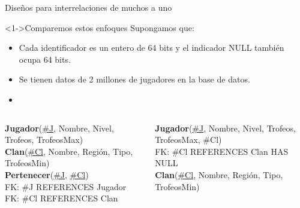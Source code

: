 \begin{frame}{Dise\~nos para interrelaciones de muchos a uno}
    \begin{small}
        
        \begin{block}<1->{Comparemos estos enfoques}
            Supongamos que: \begin{itemize}
                \item  Cada identificador es un entero de 64 bits y el indicador NULL tambi\'en ocupa 64 bits.
                \item  Se tienen datos de 2 millones de jugadores en la base de datos.
                \item  {}
            \end{itemize}
        \end{block}
    \end{small}

    \begin{columns}[T]
        \begin{column}{0.48\linewidth}
            \begin{scriptsize}
                \textbf{Jugador}(\underline{\#J}, Nombre, Nivel, Trofeos, TrofeosMax)\\[2mm]
                \textbf{Clan}(\underline{\#Cl}, Nombre, Regi\'on, Tipo, TrofeosMin)\\[2mm]
  
                \textbf{Pertenecer}(\underline{\#J}, \underline{\#Cl})\\[1mm]
                \hspace{4mm} FK: \#J REFERENCES Jugador\\
                \hspace{4mm} FK: \#Cl REFERENCES Clan
            \end{scriptsize}

        \end{column}

        \begin{column}{0.5\linewidth}
            \begin{scriptsize}
                \textbf{Jugador}(\underline{\#J}, Nombre, Nivel, Trofeos, TrofeosMax, \#Cl)\\[1mm]
                \hspace{4mm} FK: \#Cl REFERENCES Clan HAS NULL\\[2mm]
                \textbf{Clan}(\underline{\#Cl}, Nombre, Regi\'on, Tipo, TrofeosMin)\\[2mm]
            \end{scriptsize}


\end{column}
\end{columns}
\end{frame}
